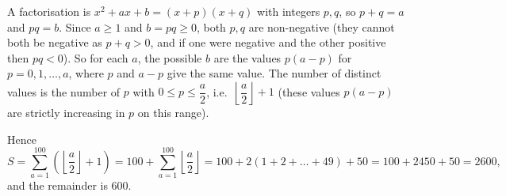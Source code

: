 A factorisation is $x^2+ax+b=(x+p)(x+q)$ with integers $p,q$, so $p+q=a$ and $pq=b$. Since $a\ge1$ and $b=pq\ge0$, both $p,q$ are non-negative (they cannot both be negative as $p+q>0$, and if one were negative and the other positive then $pq<0$). So for each $a$, the possible $b$ are the values $p(a-p)$ for $p=0,1,\dots,a$, where $p$ and $a-p$ give the same value. The number of distinct values is the number of $p$ with $0\le p\le\dfrac {a}{2}$, i.e.\ $\left\lfloor\dfrac {a}{2}\right\rfloor+1$ (these values $p(a-p)$ are strictly increasing in $p$ on this range).

Hence
\[
S=\sum_{a=1}^{100}\left(\left\lfloor\dfrac {a}{2}\right\rfloor+1\right)=100+\sum_{a=1}^{100}\left\lfloor\dfrac {a}{2}\right\rfloor=100+2(1+2+\dots+49)+50=100+2450+50=2600,
\]
and the remainder is $\boxed{600}$.
